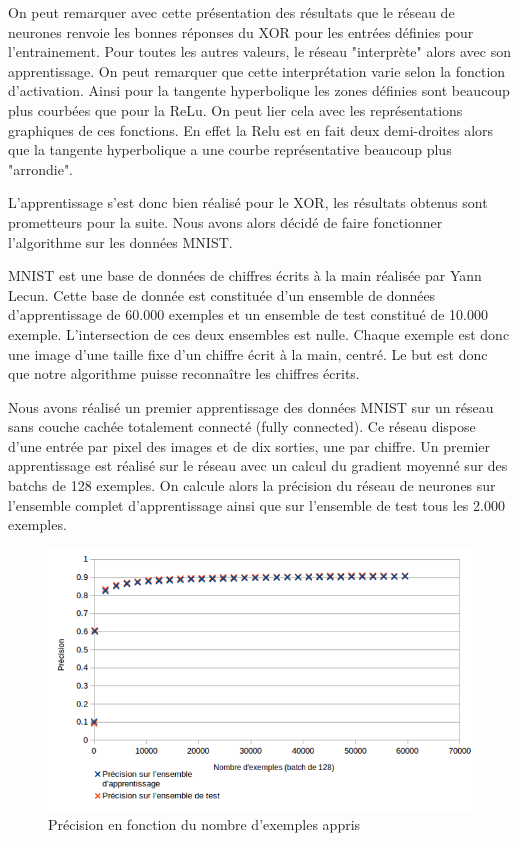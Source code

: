 \documentclass{report}
\begin{document}
On peut remarquer avec cette présentation des résultats que le réseau de neurones renvoie les bonnes réponses du XOR pour les entrées définies pour l'entrainement. Pour toutes les autres valeurs,  le réseau "interprète" alors avec son apprentissage. On peut remarquer que cette interprétation varie selon la fonction d'activation. Ainsi pour la tangente hyperbolique les zones définies sont beaucoup plus courbées que pour la ReLu. On peut lier cela avec les représentations graphiques de ces fonctions. En effet la Relu est en fait deux demi-droites alors que la tangente hyperbolique a une courbe représentative beaucoup plus "arrondie".

L'apprentissage s'est donc bien réalisé pour le XOR, les résultats obtenus sont prometteurs pour la suite. Nous avons alors décidé de faire fonctionner l'algorithme sur les données MNIST.

MNIST est une base de données de chiffres écrits à la main réalisée par Yann Lecun. Cette base de donnée est constituée d'un ensemble de données d'apprentissage de 60.000 exemples et un ensemble de test constitué de 10.000 exemple. L'intersection de ces deux ensembles est nulle. Chaque exemple est donc une image d'une taille fixe d'un chiffre écrit à la main, centré. Le but est donc que notre algorithme puisse reconnaître les chiffres écrits.

Nous avons réalisé un premier apprentissage des données MNIST sur un réseau sans couche cachée totalement connecté (fully connected). Ce réseau dispose d'une entrée par pixel des images et de dix sorties, une par chiffre. Un premier apprentissage est réalisé sur le réseau avec un calcul du gradient moyenné sur des batchs de 128 exemples. On calcule alors la précision du réseau de neurones sur l'ensemble complet d'apprentissage ainsi que sur l'ensemble de test tous les 2.000 exemples.

\begin{figure}[!h]
\begin{center}
\includegraphics[scale=0.5]{images/mnist_apprentissage_128.png}
\caption{Précision en fonction du nombre d'exemples appris}
\label{mnist_apprentissage_128}
\end{center}
\end{figure}
\end{document}
